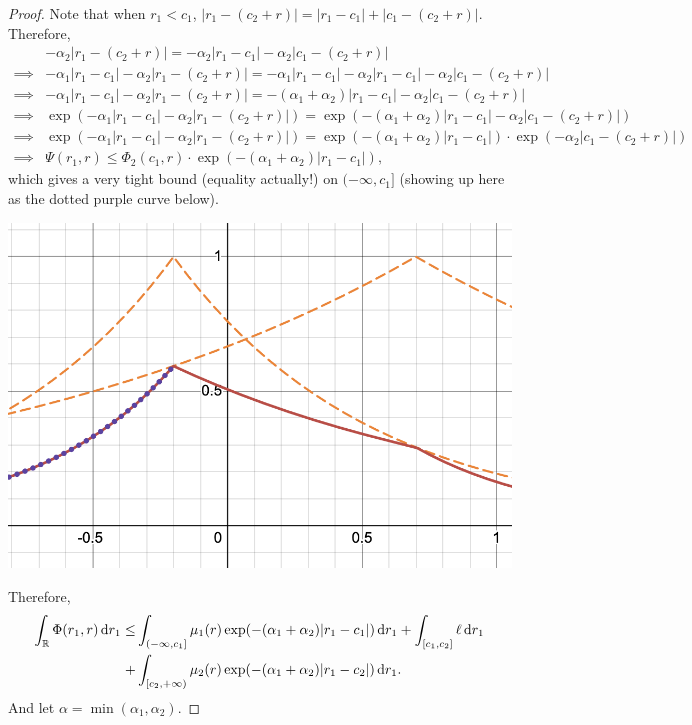 \documentclass[12pt]{article}
\begin{document}
\begin{proof}
Note that when \(r_1 < c_1\), \(|r_1 - (c_2+r)| = |r_1 - c_1| + |c_1 - (c_2+r)|\).
Therefore,
\begin{align*}
    &-\alpha_2|r_1 - (c_2+r)| = -\alpha_2|r_1 - c_1| -\alpha_2|c_1 - (c_2+r)|\\
    \implies & -\alpha_1|r_1-c_1|-\alpha_2|r_1 - (c_2+r)|= -\alpha_1|r_1-c_1|-\alpha_2|r_1 - c_1| -\alpha_2|c_1 - (c_2+r)|\\
    \implies & -\alpha_1|r_1-c_1|-\alpha_2|r_1 - (c_2+r)|= -(\alpha_1 + \alpha_2)|r_1 - c_1| -\alpha_2|c_1 - (c_2+r)|\\
    \implies & \exp(-\alpha_1|r_1-c_1|-\alpha_2|r_1 - (c_2+r)|) = \exp(-(\alpha_1 + \alpha_2)|r_1 - c_1| -\alpha_2|c_1 - (c_2+r)|)\\
    \implies &\exp(-\alpha_1|r_1-c_1|-\alpha_2|r_1 - (c_2+r)|) = \exp(-(\alpha_1 + \alpha_2)|r_1 - c_1|)\cdot \exp(-\alpha_2|c_1 - (c_2+r)|)\\
    \implies & \Psi(r_1,r) \leq \Phi_2(c_1,r) \cdot \exp(-(\alpha_1 + \alpha_2)|r_1 - c_1|),
\end{align*}
which gives a very tight bound (equality actually!) on \((-\infty, c_1]\) (showing up here as the dotted purple curve below).

\begin{center}
    \includegraphics[scale=0.5]{figure3.png}
\end{center}

Therefore,
\begin{align*}
    \int_{\mathbb {R}} \Phi(r_1,r) \mathop{}\!\mathrm{d} r_1 \leq& \int_{(-\infty,c_1]} \mu_1(r) \exp(-(\alpha_1 + \alpha_2)|r_1 - c_1|) \mathop{}\!\mathrm{d} r_1
    + \int_{[c_1,c_2]} \ell \mathop{}\!\mathrm{d} r_1 \\
    +&\int_{[c_2,+\infty)} \mu_2(r) \exp(-(\alpha_1 + \alpha_2)|r_1 - c_2|) \mathop{}\!\mathrm{d} r_1.
\end{align*}
And let \(\alpha = \min(\alpha_1 , \alpha_2)\).


\end{proof}
\end{document}
